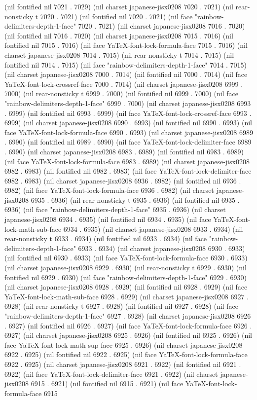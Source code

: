 (nil fontified nil 7021 . 7029) (nil charset japanese-jisx0208 7020 . 7021) (nil rear-nonsticky t 7020 . 7021) (nil fontified nil 7020 . 7021) (nil face "rainbow-delimiters-depth-1-face" 7020 . 7021) (nil charset japanese-jisx0208 7016 . 7020) (nil fontified nil 7016 . 7020) (nil charset japanese-jisx0208 7015 . 7016) (nil fontified nil 7015 . 7016) (nil face YaTeX-font-lock-formula-face 7015 . 7016) (nil charset japanese-jisx0208 7014 . 7015) (nil rear-nonsticky t 7014 . 7015) (nil fontified nil 7014 . 7015) (nil face "rainbow-delimiters-depth-1-face" 7014 . 7015) (nil charset japanese-jisx0208 7000 . 7014) (nil fontified nil 7000 . 7014) (nil face YaTeX-font-lock-crossref-face 7000 . 7014) (nil charset japanese-jisx0208 6999 . 7000) (nil rear-nonsticky t 6999 . 7000) (nil fontified nil 6999 . 7000) (nil face "rainbow-delimiters-depth-1-face" 6999 . 7000) (nil charset japanese-jisx0208 6993 . 6999) (nil fontified nil 6993 . 6999) (nil face YaTeX-font-lock-crossref-face 6993 . 6999) (nil charset japanese-jisx0208 6990 . 6993) (nil fontified nil 6990 . 6993) (nil face YaTeX-font-lock-formula-face 6990 . 6993) (nil charset japanese-jisx0208 6989 . 6990) (nil fontified nil 6989 . 6990) (nil face YaTeX-font-lock-delimiter-face 6989 . 6990) (nil charset japanese-jisx0208 6983 . 6989) (nil fontified nil 6983 . 6989) (nil face YaTeX-font-lock-formula-face 6983 . 6989) (nil charset japanese-jisx0208 6982 . 6983) (nil fontified nil 6982 . 6983) (nil face YaTeX-font-lock-delimiter-face 6982 . 6983) (nil charset japanese-jisx0208 6936 . 6982) (nil fontified nil 6936 . 6982) (nil face YaTeX-font-lock-formula-face 6936 . 6982) (nil charset japanese-jisx0208 6935 . 6936) (nil rear-nonsticky t 6935 . 6936) (nil fontified nil 6935 . 6936) (nil face "rainbow-delimiters-depth-1-face" 6935 . 6936) (nil charset japanese-jisx0208 6934 . 6935) (nil fontified nil 6934 . 6935) (nil face YaTeX-font-lock-math-sub-face 6934 . 6935) (nil charset japanese-jisx0208 6933 . 6934) (nil rear-nonsticky t 6933 . 6934) (nil fontified nil 6933 . 6934) (nil face "rainbow-delimiters-depth-1-face" 6933 . 6934) (nil charset japanese-jisx0208 6930 . 6933) (nil fontified nil 6930 . 6933) (nil face YaTeX-font-lock-formula-face 6930 . 6933) (nil charset japanese-jisx0208 6929 . 6930) (nil rear-nonsticky t 6929 . 6930) (nil fontified nil 6929 . 6930) (nil face "rainbow-delimiters-depth-1-face" 6929 . 6930) (nil charset japanese-jisx0208 6928 . 6929) (nil fontified nil 6928 . 6929) (nil face YaTeX-font-lock-math-sub-face 6928 . 6929) (nil charset japanese-jisx0208 6927 . 6928) (nil rear-nonsticky t 6927 . 6928) (nil fontified nil 6927 . 6928) (nil face "rainbow-delimiters-depth-1-face" 6927 . 6928) (nil charset japanese-jisx0208 6926 . 6927) (nil fontified nil 6926 . 6927) (nil face YaTeX-font-lock-formula-face 6926 . 6927) (nil charset japanese-jisx0208 6925 . 6926) (nil fontified nil 6925 . 6926) (nil face YaTeX-font-lock-math-sup-face 6925 . 6926) (nil charset japanese-jisx0208 6922 . 6925) (nil fontified nil 6922 . 6925) (nil face YaTeX-font-lock-formula-face 6922 . 6925) (nil charset japanese-jisx0208 6921 . 6922) (nil fontified nil 6921 . 6922) (nil face YaTeX-font-lock-delimiter-face 6921 . 6922) (nil charset japanese-jisx0208 6915 . 6921) (nil fontified nil 6915 . 6921) (nil face YaTeX-font-lock-formula-face 6915 
